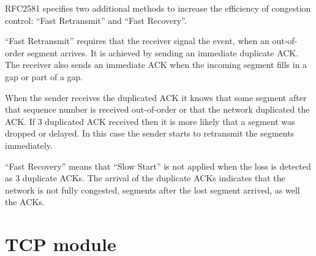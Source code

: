 RFC2581 specifies two additional methods to increase the efficiency
of congestion control: ``Fast Retransmit'' and ``Fast Recovery''.

``Fast Retransmit'' requires that the receiver signal the event,
when an out-of-order segment arrives. It is achieved by sending
an immediate duplicate ACK. The receiver also sends an immediate
ACK when the incoming segment fills in a gap or part of a gap.

When the sender receives the duplicated ACK it knows that some
segment after that sequence number is received out-of-order or
that the network duplicated the ACK. If 3 duplicated ACK received
then it is more likely that a segment was dropped or delayed.
In this case the sender starts to retransmit the segments
immediately.

``Fast Recovery'' means that ``Slow Start'' is not applied
when the loss is detected as 3 duplicate ACKs. The arrival
of the duplicate ACKs indicates that the network is not fully
congested, segments after the lost segment arrived, as well
the ACKs.

% 
% 
% 
% 
% 
% 


\section{TCP module}

